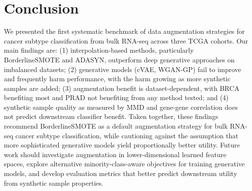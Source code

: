 \documentclass{article}
\begin{document}
\section{Conclusion}

We presented the first systematic benchmark of data augmentation strategies for cancer subtype
classification from bulk RNA-seq across three TCGA cohorts. Our main findings are: (1)
interpolation-based methods, particularly BorderlineSMOTE and ADASYN, outperform deep generative
approaches on imbalanced datasets; (2) generative models (cVAE, WGAN-GP) fail to improve and
frequently harm performance, with the harm growing as more synthetic samples are added; (3)
augmentation benefit is dataset-dependent, with BRCA benefiting most and PRAD not benefiting
from any method tested; and (4) synthetic sample quality as measured by MMD and gene-gene
correlation does not predict downstream classifier benefit. Taken together, these findings
recommend BorderlineSMOTE as a default augmentation strategy for bulk RNA-seq cancer subtype
classification, while cautioning against the assumption that more sophisticated generative
models yield proportionally better utility. Future work should investigate augmentation in
lower-dimensional learned feature spaces, explore alternative minority-class-aware objectives
for training generative models, and develop evaluation metrics that better predict downstream
utility from synthetic sample properties.
\end{document}
